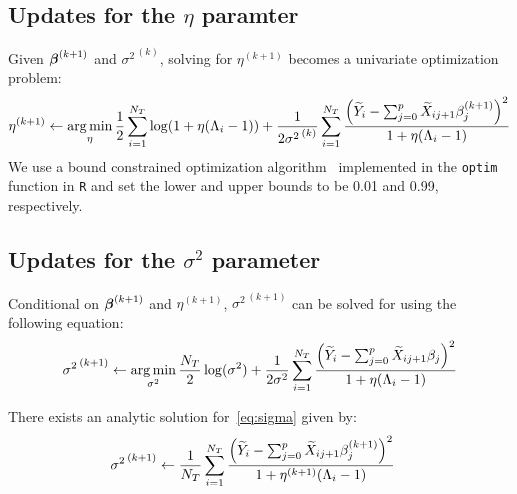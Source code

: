 \begin{comment}
Conditional on $\eta^{(k)}$ and ${\sigma^2}^{\,(k)}$, it can be shown that the solution for $\bbeta$ is a weighted lasso problem with observation weights given by~\eqref{eq:weights}.

The full derivation is given in Section~\ref{subsec:l1penalty}. Therefore, $\bbeta^{(k+1)}$ can be efficiently solved using the \texttt{glmnet} algorithm~\citep{friedman2010regularization}. Note that the rescaling of the weights to sum to $N_T$ is what is being done in \texttt{glmnet}.
\end{comment}




\subsection{Updates for the $\eta$ paramter}
Given $\boldsymbol{\beta}^{(k+1)}$ and ${\sigma^2}^{\,(k)}$, solving for $\eta^{(k+1)}$ becomes a univariate optimization problem:
\begin{equation}
\eta^{(k+1)} \leftarrow \operatorname*{arg\,min}_{\eta}  \frac{1}{2} \sum_{i=1}^{N_T} \log(1 + \eta (\Lambda_i-1)) + \frac{1}{2{\sigma^2}^{\,(k)}} \sum_{i=1}^{N_T}\frac{\left(  \widetilde{Y}_i - \sum_{j=0}^{p}\widetilde{X}_{ij+1}\beta_j^{(k+1)} \right) ^2}{1 + \eta (\Lambda_i-1)}
\end{equation}
We use a bound constrained optimization algorithm~\citep{byrd1995limited} implemented in the \texttt{optim} function in \texttt{R} and set the lower and upper bounds to be 0.01 and 0.99, respectively.



\subsection{Updates for the $\sigma^2$ parameter}

Conditional on $\boldsymbol{\beta}^{(k+1)}$ and $\eta^{(k+1)}$, ${\sigma^2}^{\,(k+1)}$ can be solved for using the following equation:
\begin{equation}
{\sigma^2}^{\,(k+1)} \leftarrow \operatorname*{arg\,min}_{\sigma^2}  \frac{N_T}{2}\log(\sigma^2) + \frac{1}{2\sigma^2} \sum_{i=1}^{N_T}\frac{\left(  \widetilde{Y}_i - \sum_{j=0}^{p}\widetilde{X}_{ij+1}\beta_j \right) ^2}{1 + \eta (\Lambda_i-1)} \label{eq:sigma}
\end{equation}

There exists an analytic solution for~\eqref{eq:sigma} given by:
\begin{align}
{\sigma^2}^{\,(k+1)} & \gets \frac{1}{N_T}\sum_{i=1}^{N_T}\frac{\left(  \widetilde{Y}_i - \sum_{j=0}^{p}\widetilde{X}_{ij+1}\beta_j^{(k+1)} \right) ^2}{1 + \eta^{(k+1)} (\Lambda_i-1)} \label{eq:sigmahat2}
\end{align}


